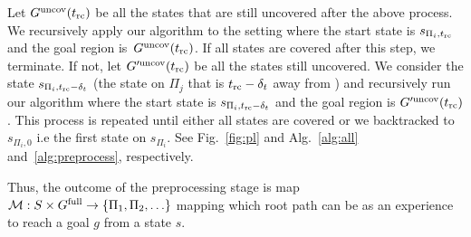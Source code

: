 \documentclass[a4paper]{report}
\begin{document}
Let $G^{\textrm{uncov}}(t_{\textrm{rc}})$ be all the states that are still uncovered after the above process. We recursively apply our algorithm to the setting where the start state is $s_{\Pi_i, t_{\textrm{rc}}}$ and the goal region is~$G^{\textrm{uncov}}(t_{\textrm{rc}})$.
If all states are covered after this step, we terminate. 
If not, let $G'^{\textrm{uncov}}(t_{\textrm{rc}})$ be all the states still uncovered.
We consider the state $s_{\Pi_i, t_{\textrm{rc}}-\delta_t}$ (the state on $\Pi_j$ that is $t_{\textrm{rc}}-\delta_t$ away from \Shome) and recursively run our algorithm where the start state is $s_{\Pi_i, t_{\textrm{rc}}-\delta_t}$ and the goal region is $G'^{\textrm{uncov}}(t_{\textrm{rc}})$.
This process is repeated until either all states are covered or we backtracked to $s_{\Pi_i, 0}$ i.e the first state on $s_{\Pi_i}$.
See Fig.~\ref{fig:pl} and  Alg.~\ref{alg:all} and~\ref{alg:preprocess}, respectively.

Thus, the outcome of the preprocessing stage is map $\mathcal{M}: S \times G^{\textrm{full}} \rightarrow \{ \Pi_1, \Pi_2, \ldots \}$ mapping which root path can be as an experience to reach a goal $g$ from a state $s$.
\end{document}
